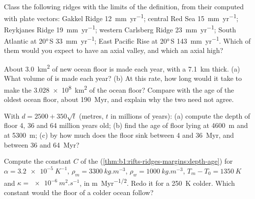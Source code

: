 \begin{exercise}[$\star$]\label{exo:b1:rifts-ridges-margins:3}
Class the following ridges with the limits of the definition, from their  computed with plate vectors: Gakkel Ridge
\qty{12}{mm.yr^{-1}}; central Red Sea \qty{15}{mm.yr^{-1}}; Reykjanes Ridge
\qty{19}{mm.yr^{-1}}; western Carlsberg Ridge \qty{23}{mm.yr^{-1}}; South
Atlantic at \ang{20}\,S \qty{33}{mm.yr^{-1}}; East Pacific Rise at
\ang{20}\,S \qty{143}{mm.yr^{-1}}. Which of them would you expect to have an
axial valley, and which an axial high?
\end{exercise}

\begin{exercise}[$\star$]\label{exo:b1:rifts-ridges-margins:4}
About \qty{3.0}{km^2} of new ocean floor is made each year, with a 
\qty{7.1}{km} thick. (a) What volume of  is made each year? (b) At this
rate, how long would it take to make the \qty{3.028e8}{km^2} of the ocean
floor? Compare with the age of the oldest ocean floor, about
\qty{190}{Myr}, and explain why the two need not agree.
\end{exercise}

\begin{exercise}[$\star\star$]\label{exo:b1:rifts-ridges-margins:5}
With $d = 2500 + 350\sqrt t$ (metres, $t$ in millions of years): (a) compute
the depth of floor 4, 36 and 64 million years old; (b) find the age of floor
lying at \qty{4600}{m} and at \qty{5300}{m}; (c) by how much does the floor
sink between 4 and \qty{36}{Myr}, and between 36 and \qty{64}{Myr}?
\end{exercise}

\begin{exercise}[$\star\star$]\label{exo:b1:rifts-ridges-margins:6}
Compute the constant $C$ of the 
(\cref{thm:b1:rifts-ridges-margins:depth-age}) for $\alpha =
\qty{3.2e-5}{K^{-1}}$, $\rho_m = \qty{3300}{kg.m^{-3}}$, $\rho_w =
\qty{1000}{kg.m^{-3}}$, $T_m - T_0 = \qty{1350}{K}$ and $\kappa =
\qty{e-6}{m^2.s^{-1}}$, in \unit{m.Myr^{-1/2}}. Redo it for a 
\qty{250}{K} colder. Which constant would the floor of a colder ocean follow?
\end{exercise}

